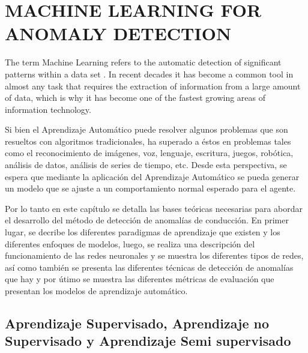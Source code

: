 \chapter{\uppercase{Machine Learning for Anomaly detection}}
\label{Capitulo 3}

The term Machine Learning refers to the automatic detection of significant patterns within a data set \cite{Reference32}. In recent decades it has become a common tool in almost any task that requires the extraction of information from a large amount of data, which is why it has become one of the fastest growing areas of information technology.

\vspace{5mm} %

Si bien el Aprendizaje Autom\'{a}tico puede resolver algunos problemas que son resueltos con algoritmos tradicionales, ha superado a \'{e}stos en problemas tales como el reconocimiento de im\'{a}genes, voz, lenguaje, escritura, juegos, rob\'{o}tica, an\'{a}lisis de datos, an\'{a}lisis de series de tiempo, etc. Desde esta perspectiva, se espera que mediante la aplicaci\'{o}n del Aprendizaje Autom\'{a}tico se pueda generar un modelo que se ajuste a un comportamiento normal esperado para el agente.

\vspace{5mm} %

Por lo tanto en este cap\'{i}tulo se detalla las bases te\'{o}ricas necesarias para abordar el desarrollo del m\'{e}todo de detecci\'{o}n de anomal\'{i}as de conducci\'{o}n. En primer lugar, se decribe los diferentes paradigmas de aprendizaje que existen y los diferentes enfoques de modelos, luego, se realiza una descripci\'{o}n del funcionamiento de las redes neuronales y se muestra los diferentes tipos de redes, as\'{i} como tambi\'{e}n se presenta las diferentes t\'{e}cnicas de detecci\'{o}n de anomal\'{i}as que hay y por \'{u}timo se muestra las diferentes m\'{e}tricas de evaluaci\'{o}n que presentan los modelos de aprendizaje autom\'{a}tico. 

\section{Aprendizaje Supervisado, Aprendizaje no Supervisado y Aprendizaje Semi supervisado}
\label{section|aprendizaje}

